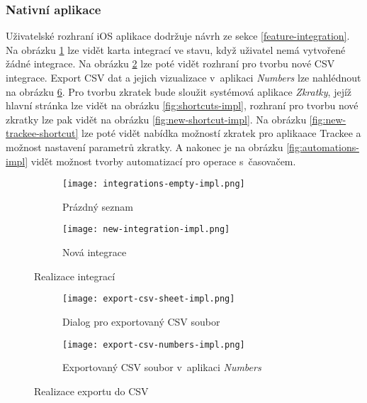 \subsubsection{Nativní aplikace}

Uživatelské rozhraní iOS aplikace dodržuje návrh ze sekce \ref{feature-integration}. Na obrázku \ref{fig:integrations-empty-impl} lze vidět karta integrací ve stavu, když uživatel nemá vytvořené žádné integrace. Na obrázku \ref{fig:new-integration-impl} lze poté vidět rozhraní pro tvorbu nové CSV integrace. Export CSV dat a jejich vizualizace v~aplikaci \emph{Numbers} lze nahlédnout na obrázku \ref{fig:export-csv-impl}. Pro tvorbu zkratek bude sloužit systémová aplikace \emph{Zkratky}, jejíž hlavní stránka lze vidět na obrázku \ref{fig:shortcuts-impl}, rozhraní pro tvorbu nové zkratky lze pak vidět na obrázku \ref{fig:new-shortcut-impl}. Na obrázku \ref{fig:new-trackee-shortcut} lze poté vidět nabídka možností zkratek pro aplikaace Trackee a možnost nastavení parametrů zkratky. A nakonec je na obrázku \ref{fig:automations-impl} vidět možnost tvorby automatizací pro operace s~časovačem.

\begin{figure}[p]
    \centering
    \begin{subfigure}[b]{0.4\textwidth}
		\centering
		\texttt{[image: integrations-empty-impl.png]}
		\caption{Prázdný seznam}
		\label{fig:integrations-empty-impl}
	\end{subfigure}
	\hspace{2cm}
	\begin{subfigure}[b]{0.4\textwidth}
		\centering
		\texttt{[image: new-integration-impl.png]}
		\caption{Nová integrace}
		\label{fig:new-integration-impl}
	\end{subfigure}
	\caption{Realizace integrací}
	\label{fig:integrations-impl}
\end{figure}

\begin{figure}[p]
    \centering
    \begin{subfigure}[b]{0.4\textwidth}
		\centering
		\texttt{[image: export-csv-sheet-impl.png]}
		\caption{Dialog pro exportovaný CSV soubor}
		\label{fig:export-csv-sheet-impl}
	\end{subfigure}
	\hspace{2cm}
	\begin{subfigure}[b]{0.4\textwidth}
		\centering
		\texttt{[image: export-csv-numbers-impl.png]}
		\caption{Exportovaný CSV soubor v~aplikaci \emph{Numbers}}
		\label{fig:export-csv-numbers-impl}
	\end{subfigure}
	\caption{Realizace exportu do CSV}
	\label{fig:export-csv-impl}
\end{figure}

